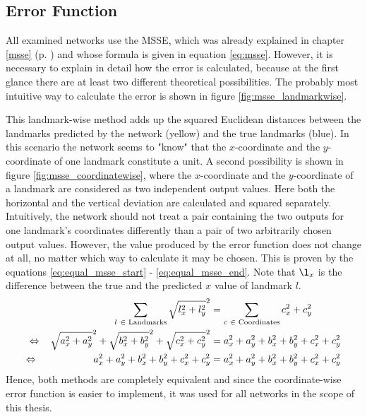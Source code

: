 \documentclass[11pt, a4paper]{article}
\renewcommand\equiv{\Leftrightarrow}
\newcommand\myref[1]{\ref{#1} (p. \pageref{#1})}
\begin{document}
\subsection{Error Function}

All examined networks use the \ac{MSSE}, which was already explained in chapter \myref{msse} and whose formula is given in equation \eqref{eq:msse}. However, it is necessary to explain in detail how the error is calculated, because at the first glance there are at least two different theoretical possibilities. The probably most intuitive way to calculate the error is shown in figure \ref{fig:msse_landmarkwise}.

This landmark-wise method adds up the squared Euclidean distances between the landmarks predicted by the network (yellow) and the true landmarks (blue). In this scenario the network seems to "know" that the $x$-coordinate and the $y$-coordinate of one landmark constitute a unit. A second possibility is shown in figure \ref{fig:msse_coordinatewise}, where the $x$-coordinate and the $y$-coordinate of a landmark are considered as two independent output values. Here both the horizontal and the vertical deviation are calculated and squared separately. Intuitively, the network should not treat a pair containing the two outputs for one landmark's coordinates differently than a pair of two arbitrarily chosen output values. However, the value produced by the error function does not change at all, no matter which way to calculate it may be chosen. This is proven by the equations \eqref{eq:equal_msse_start} - \eqref{eq:equal_msse_end}. Note that $\l_x$ is the difference between the true and the predicted $x$ value of landmark $l$.
\begin{align}
\label{eq:equal_msse_start}
\sum_{l\ \in \text{ Landmarks}} \sqrt{l_x^2 + l_y^2}^2 &= \sum_{c\ \in \text{ Coordinates}} c_x^2 + c_y^2\\
\equiv \hspace{0.3cm} \sqrt{a_x^2 + a_y^2}^2 + \sqrt{b_x^2 + b_y^2}^2 + \sqrt{c_x^2 + c_y^2}^2 &= a_x^2 + a_y^2 + b_x^2 + b_y^2 + c_x^2 + c_y^2\\
\label{eq:equal_msse_end}
\equiv \hspace{1.95cm} a_x^2 + a_y^2 + b_x^2 + b_y^2 + c_x^2 + c_y^2 &= a_x^2 + a_y^2 + b_x^2 + b_y^2 + c_x^2 + c_y^2
\end{align}
Hence, both methods are completely equivalent and since the coordinate-wise error function is easier to implement, it was used for all networks in the scope of this thesis.
\end{document}
